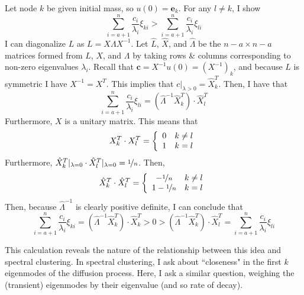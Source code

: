 \documentclass[10pt]{article}
\theoremstyle{definition}
\numberwithin{theorem}{section}
\numberwithin{definition}{section}
\numberwithin{lemma}{section}
\numberwithin{corollary}{section}
\numberwithin{clm}{section}
\numberwithin{rmk}{section}
\renewcommand{\b}{\bm}
\begin{document}
Let node $k$ be given initial mass, so $u(0) = \b{e}_k$. For any $l \neq k$, I show
\begin{equation}\label{first_wins}
\sum_{i =a+1}^n \frac{c_i}{\lambda_i}\xi_{ki} > \sum_{i =a+1}^n \frac{c_i}{\lambda_i}\xi_{li}
\end{equation}
I can diagonalize $L$ as $L = X\Lambda X^{-1}$. Let $\hat{L}$, $\hat{X}$, and $\hat{\Lambda}$ be the $n-a\times n-a$ matrices formed from $L$, $X$, and $\Lambda$ by taking rows \& columns corresponding to non-zero eigenvalues $\lambda_i$. Recall that $\b{c} = X^{-1}u(0) = (X^{-1})_k$, and because $L$ is symmetric I have $X^{-1} = X^T$. This implies that $c|_{\lambda >0} = \hat{X}^T_k$. Then, I have that
\begin{equation}
\sum_{i =a+1}^n \frac{c_i}{\lambda_i}\xi_{li} = (\hat{\Lambda}^{-1} \hat{X}^T_k)\cdot \hat{X}^T_l
\end{equation}
Furthermore, $X$ is a unitary matrix. This means that 
\begin{equation}
X^T_k \cdot X^T_l = \left\{\begin{array}{c c}
0 & k \neq l \\
1 & k = l
\end{array}\right.
\end{equation}
Furthermore, $ \hat{X}^T_k|_{\lambda = 0} \cdot \hat{X}^T_l|_{\lambda = 0} = \nicefrac{1}{n}$. Then,
\begin{equation}
\hat{X}^T_k \cdot \hat{X}^T_l = \left\{\begin{array}{c c}
-\nicefrac{1}{n} & k \neq l \\
1 - \nicefrac{1}{n} & k = l
\end{array}\right.
\end{equation}
Then, because $\hat{\Lambda}^{-1}$ is clearly positive definite, I can conclude that 
\begin{equation}
\sum_{i =a+1}^n \frac{c_i}{\lambda_i}\xi_{ki} = (\hat{\Lambda}^{-1} \hat{X}^T_k)\cdot \hat{X}^T_k > 0>   (\hat{\Lambda}^{-1} \hat{X}^T_k)\cdot \hat{X}^T_l = \sum_{i =a+1}^n \frac{c_i}{\lambda_i}\xi_{li} 
\end{equation}

This calculation reveals the nature of the relationship between this idea and spectral clustering. In spectral clustering, I ask about ``closeness" in the first $k$ eigenmodes of the diffusion process. Here, I ask a similar question, weighing the (transient) eigenmodes by their eigenvalue (and so rate of decay).
\end{document}
